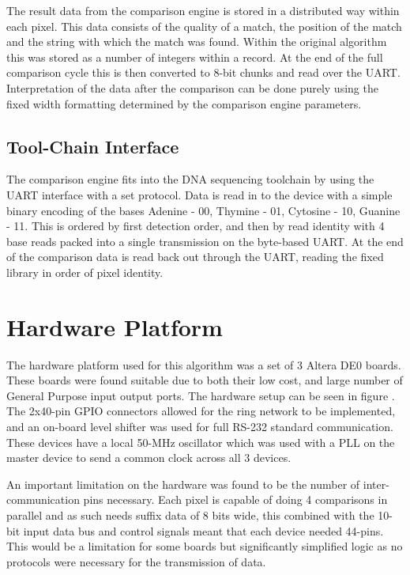 \documentclass[conference]{IEEEtran}
\begin{document}
The result data from the comparison engine is stored in a distributed way within each pixel. This data consists of the quality of a match, the position of the match and the string with which the match was found. Within the original algorithm this was stored as a number of integers within a record. At the end of the full comparison cycle this is then converted to 8-bit chunks and read over the UART. Interpretation of the data after the comparison can be done purely using the fixed width formatting determined by the comparison engine parameters.


\subsection{Tool-Chain Interface}
The comparison engine fits into the DNA sequencing toolchain by using the UART interface with a set protocol. Data is read in to the device with a simple binary encoding of the bases Adenine - 00, Thymine - 01, Cytosine - 10, Guanine - 11. This is ordered by first detection order, and then by read identity with 4 base reads packed into a single transmission on the byte-based UART. At the end of the comparison data is read back out through the UART, reading the fixed library in order of pixel identity. 


\section{Hardware Platform}

The hardware platform used for this algorithm was a set of 3 Altera DE0 boards. These boards were found suitable due to both their low cost, and large number of General Purpose input output ports. The hardware setup can be seen in figure \cite{fig:de0}. The 2x40-pin GPIO connectors allowed for the ring network to be implemented, and an on-board level shifter was used for full RS-232 standard communication. These devices have a local 50-MHz oscillator which was used with a PLL on the master device to send a common clock across all 3 devices. 

An important limitation on the hardware was found to be the number of inter-communication pins necessary. Each pixel is capable of doing 4 comparisons in parallel and as such needs suffix data of 8 bits wide, this combined with the 10-bit input data bus and control signals meant that each device needed 44-pins. This would be a limitation for some boards but significantly simplified logic as no protocols were necessary for the transmission of data. 
\end{document}
